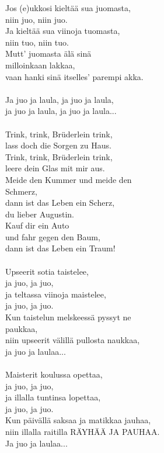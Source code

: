 
Jos (e)ukkosi kieltää sua juomasta,\\ 
niin juo, niin juo.\\
Ja kieltää sua viinoja tuomasta,\\
niin tuo, niin tuo.\\
Mutt' juomasta älä sinä\\
milloinkaan lakkaa,\\ 
vaan hanki sinä itselles' parempi akka.\\ \hspace{10mm} \\ 
Ja juo ja laula, ja juo ja laula,\\
ja juo ja laula, ja juo ja laula...\\
\hspace{10mm} \\
Trink, trink, Brüderlein trink,\\ 
lass doch die Sorgen zu Haus.\\ 
Trink, trink, Brüderlein trink,\\ 
leere dein Glas mit mir aus.\\ 
Meide den Kummer und meide den\\
Schmerz,\\
dann ist das Leben ein Scherz,\\ 
du lieber Augustin.\\ 
Kauf dir ein Auto\\ 
und fahr gegen den Baum,\\ 
dann ist das Leben ein Traum!
\\ \hspace{10mm} \\
Upseerit sotia taistelee,\\ 
ja juo, ja juo,\\ 
ja teltassa viinoja maistelee,\\ 
ja juo, ja juo.\\
Kun taistelun melskeessä pyssyt ne\\ 
paukkaa,\\ 
niin upseerit välillä pullosta naukkaa,\\
ja juo ja laulaa...\\
\hspace{10mm} \\ 
Maisterit koulussa opettaa,\\ 
ja juo, ja juo,\\ 
ja illalla tuntinsa lopettaa,\\ 
ja juo, ja juo.\\
Kun päivällä saksaa ja matikkaa jauhaa,\\ 
niin illalla raitilla RÄYHÄÄ JA PAUHAA.\\ 
Ja juo ja laulaa... \\ 

